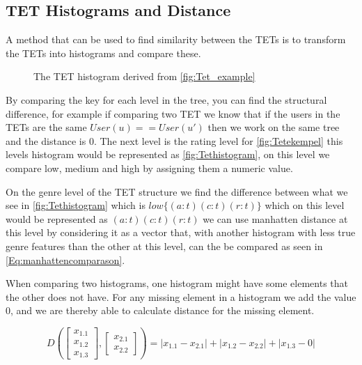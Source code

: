 \subsection{TET Histograms and Distance}
	A method that can be used to find similarity between the TETs is to transform the TETs into histograms and compare these\cite{JAEGER201330}. 
	\begin{figure}[H]
		\centering
		\begin{adjustbox}{width=0.5\textwidth}
			
		\end{adjustbox}
		\caption{The TET histogram derived from \autoref{fig:Tet_example}}
		\label{fig:Tethistogram}
	\end{figure}
	
	By comparing the key for each level in the tree, you can find the structural difference, for example if comparing two TET we know that if the users in the TETs are the same $User(u) == User(u')$ then we work on the same tree and the distance is $0$. The next level is the rating level for \autoref{fig:Tetekempel} this levels histogram would be represented as \autoref{fig:Tethistogram}, on this level we compare low, medium and high by assigning them a numeric value.
	
	On the genre level of the TET structure we find the difference between what we see in \autoref{fig:Tethistogram} which is $low\{(a:t)(c:t)(r:t)\}$ which on this level would be represented as $(a:t)(c:t)(r:t)$ we can use manhatten distance at this level by considering it as a vector that, with another histogram with less true genre features than the other at this level, can the be compared as seen in \autoref{Eq:manhattencomparason}\cite{singh2013k}.
	
	When comparing two histograms, one histogram might have some elements that the other does not have. For any missing element in a histogram we add the value $0$, and we are thereby able to calculate distance for the missing element.
	
	\begin{equation}\label{Eq:manhattencomparason}
	D(\begin{bmatrix}
	x_{1.1} \\
	x_{1.2} \\
	x_{1.3}
	\end{bmatrix},
	\begin{bmatrix}
	x_{2.1} \\
	x_{2.2}
	\end{bmatrix})= |x_{1.1} - x_{2.1}| + |x_{1.2} - x_{2.2}| + |x_{1.3} - 0|
	\end{equation}
	
